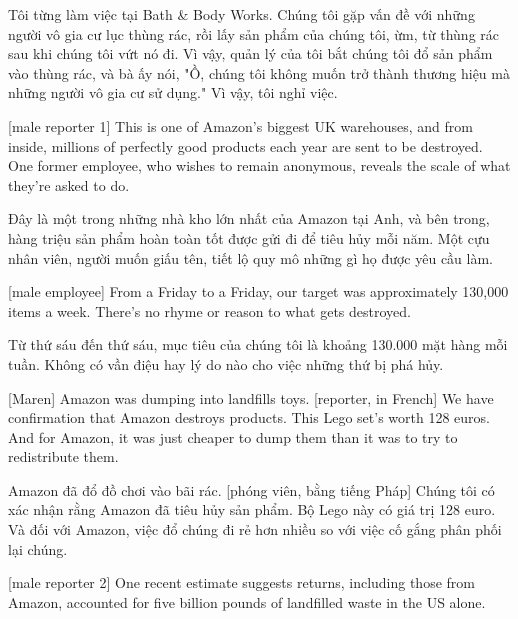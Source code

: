 \documentclass[a4paper]{article}
\begin{document}
	\begin{vietnamese-v2}
		[phụ nữ] Tôi từng làm việc tại Bath \& Body Works.
		Chúng tôi gặp vấn đề với những người vô gia cư lục thùng rác, rồi lấy sản phẩm của chúng tôi, ừm, từ thùng rác sau khi chúng tôi vứt nó đi.
		Vì vậy, quản lý của tôi bắt chúng tôi đổ sản phẩm vào thùng rác, và bà ấy nói, "Ồ, chúng tôi không muốn trở thành thương hiệu mà những người vô gia cư sử dụng."
		Vì vậy, tôi nghỉ việc.
	\end{vietnamese-v2}
	
	[male reporter 1] This is one of Amazon's biggest UK warehouses, and from inside, millions of perfectly good products each year are sent to be destroyed. One former employee, who wishes to remain anonymous, reveals the scale of what they're asked to do.
	
	\begin{vietnamese-v2}
		 Đây là một trong những nhà kho lớn nhất của Amazon tại Anh, và bên trong, hàng triệu sản phẩm hoàn toàn tốt được gửi đi để tiêu hủy mỗi năm. Một cựu nhân viên, người muốn giấu tên, tiết lộ quy mô những gì họ được yêu cầu làm.
	\end{vietnamese-v2}
	
	[male employee] From a Friday to a Friday, our target was approximately 130,000 items a week.
	There's no rhyme or reason to what gets destroyed.
	
	\begin{vietnamese-v2}
		 Từ thứ sáu đến thứ sáu, mục tiêu của chúng tôi là khoảng 130.000 mặt hàng mỗi tuần.
		Không có vần điệu hay lý do nào cho việc những thứ bị phá hủy.
	\end{vietnamese-v2}
	
	[Maren] Amazon was dumping into landfills toys.
	[reporter, in French] We have confirmation that Amazon destroys products.
	This Lego set's worth 128 euros.
	And for Amazon, it was just cheaper to dump them than it was to try to redistribute them.
	
	\begin{vietnamese-v2}
		[Maren] Amazon đã đổ đồ chơi vào bãi rác.
		[phóng viên, bằng tiếng Pháp] Chúng tôi có xác nhận rằng Amazon đã tiêu hủy sản phẩm.
		Bộ Lego này có giá trị 128 euro.
		Và đối với Amazon, việc đổ chúng đi rẻ hơn nhiều so với việc cố gắng phân phối lại chúng.
	\end{vietnamese-v2}
	
	[male reporter 2] One recent estimate suggests returns, including those from Amazon, accounted for five billion pounds of landfilled waste in the US alone.
	
\end{document}
